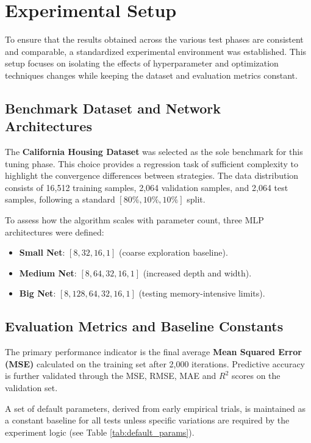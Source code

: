 \section{Experimental Setup}
\label{sec:experimental_setup}

To ensure that the results obtained across the various test phases are consistent and comparable, a standardized experimental environment was established. This setup focuses on isolating the effects of hyperparameter and optimization techniques changes while keeping the dataset and evaluation metrics constant.

\subsection{Benchmark Dataset and Network Architectures}
The \textbf{California Housing Dataset} was selected as the sole benchmark for this tuning phase. This choice provides a regression task of sufficient complexity to highlight the convergence differences between strategies. The data distribution consists of 16,512 training samples, 2,064 validation samples, and 2,064 test samples, following a standard $[80\%, 10\%, 10\%]$ split.

To assess how the algorithm scales with parameter count, three MLP architectures were defined:
\begin{itemize}
    \item \textbf{Small Net}: $[8, 32, 16, 1]$ (coarse exploration baseline).
    \item \textbf{Medium Net}: $[8, 64, 32, 16, 1]$ (increased depth and width).
    \item \textbf{Big Net}: $[8, 128, 64, 32, 16, 1]$ (testing memory-intensive limits).
\end{itemize}

\subsection{Evaluation Metrics and Baseline Constants}
The primary performance indicator is the final average \textbf{Mean Squared Error (MSE)} calculated on the training set after 2,000 iterations. Predictive accuracy is further validated through the MSE, RMSE, MAE and $R^2$ scores on the validation set. 

A set of default parameters, derived from early empirical trials, is maintained as a constant baseline for all tests unless specific variations are required by the experiment logic (see Table \ref{tab:default_params}).

